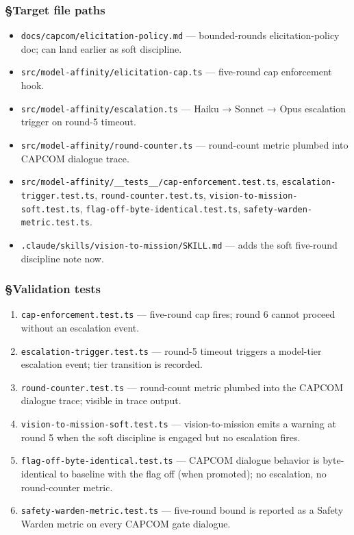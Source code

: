 \documentclass[11pt,letterpaper]{article}
\providecommand{\tightlist}{\setlength{\itemsep}{0pt}\setlength{\parskip}{0pt}}
\begin{document}
\subsubsection{§Target file paths}

\begin{itemize}
\tightlist
\item
  \texttt{docs/capcom/elicitation-policy.md} --- bounded-rounds
  elicitation-policy doc; can land earlier as soft discipline.
\item
  \texttt{src/model-affinity/elicitation-cap.ts} --- five-round cap
  enforcement hook.
\item
  \texttt{src/model-affinity/escalation.ts} --- Haiku → Sonnet → Opus
  escalation trigger on round-5 timeout.
\item
  \texttt{src/model-affinity/round-counter.ts} --- round-count metric
  plumbed into CAPCOM dialogue trace.
\item
  \texttt{src/model-affinity/\_\_tests\_\_/cap-enforcement.test.ts},
  \texttt{escalation-trigger.test.ts}, \texttt{round-counter.test.ts},
  \texttt{vision-to-mission-soft.test.ts},
  \texttt{flag-off-byte-identical.test.ts},
  \texttt{safety-warden-metric.test.ts}.
\item
  \texttt{.claude/skills/vision-to-mission/SKILL.md} --- adds the soft
  five-round discipline note now.
\end{itemize}

\subsubsection{§Validation tests}

\begin{enumerate}
\def\labelenumi{\arabic{enumi}.}
\tightlist
\item
  \texttt{cap-enforcement.test.ts} --- five-round cap fires; round 6
  cannot proceed without an escalation event.
\item
  \texttt{escalation-trigger.test.ts} --- round-5 timeout triggers a
  model-tier escalation event; tier transition is recorded.
\item
  \texttt{round-counter.test.ts} --- round-count metric plumbed into the
  CAPCOM dialogue trace; visible in trace output.
\item
  \texttt{vision-to-mission-soft.test.ts} --- vision-to-mission emits a
  warning at round 5 when the soft discipline is engaged but no
  escalation fires.
\item
  \texttt{flag-off-byte-identical.test.ts} --- CAPCOM dialogue behavior
  is byte-identical to baseline with the flag off (when promoted); no
  escalation, no round-counter metric.
\item
  \texttt{safety-warden-metric.test.ts} --- five-round bound is reported
  as a Safety Warden metric on every CAPCOM gate dialogue.
\end{enumerate}
\end{document}
